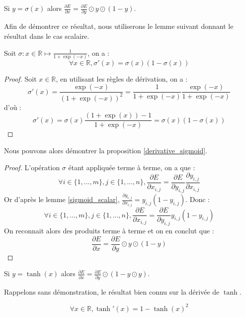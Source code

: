 \begin{proposition}
Si $y = \sigma(x)$ alors $\frac{\partial E}{\partial x} = \frac{\partial E}{\partial y} \odot y \odot (1 - y)$.
\label{derivative_sigmoid}
\end{proposition}

Afin de démontrer ce résultat, nous utiliserons le lemme suivant donnant le résultat dans le cas scalaire.

\begin{lemma}
Soit $\sigma : x \in \mathbb{R} \mapsto \frac{1}{1 + \exp(-x)}$, on a :
$$ 
\forall x \in \mathbb{R}, \sigma'(x) = \sigma(x)(1 - \sigma(x))
$$
\label{sigmoid_scalar}
\end{lemma}

\begin{proof}
Soit $x \in \mathbb{R}$, en utilisant les règles de dérivation, on a :
$$
\sigma'(x) = \frac{\exp(-x)}{(1 + \exp(-x))^2} = \frac{1}{1 + \exp(-x)}\frac{\exp(-x)}{1 + \exp(-x)}
$$
d'où :
$$
\sigma'(x) = \sigma(x)\frac{(1 + \exp(x)) - 1}{1 + \exp(-x)} =  \sigma(x)(1 - \sigma(x))
$$
\end{proof}

Nous pouvons alors démontrer la proposition \ref{derivative_sigmoid}.

\begin{proof}
L'opération $\sigma$ étant appliquée terme à terme, on a que :
$$
\forall i \in \{1, ..., m\}, j \in \{1, ..., n\}, \frac{\partial E}{\partial x_{i, j}} = \frac{\partial E}{\partial y_{i, j}}\frac{\partial y_{i, j}}{\partial x_{i, j}}
$$
Or d'après le lemme \ref{sigmoid_scalar}, $\frac{\partial y_{i, j}}{\partial x_{i, j}} = y_{i, j}(1 - y_{i, j})$. Donc :
$$
\forall i \in \{1, ..., m\}, j \in \{1, ..., n\}, \frac{\partial E}{\partial x_{i, j}} = \frac{\partial E}{\partial y_{i, j}}y_{i, j}(1 - y_{i, j})
$$
On reconnait alors des produits terme à terme et on en conclut que :
$$
\frac{\partial E}{\partial x} = \frac{\partial E}{\partial y} \odot y \odot (1 - y)
$$
\end{proof}

\begin{proposition}
Si $y = \tanh(x)$ alors $\frac{\partial E}{\partial x} = \frac{\partial E}{\partial y} \odot (1 - y \odot y)$.
\label{derivative_tanh}
\end{proposition}

Rappelons sans démonstration, le résultat bien connu sur la dérivée de $\tanh$.

\begin{lemma}
$$ 
\forall x \in \mathbb{R}, \tanh'(x) = 1 - \tanh(x)^2
$$
\label{tanh_scalar}
\end{lemma}

